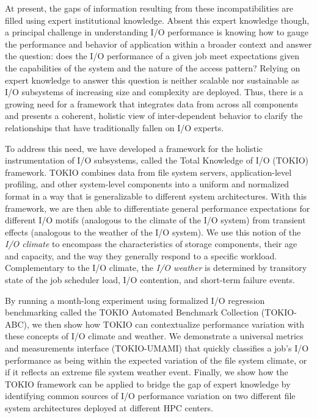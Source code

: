 At present, the gaps of information resulting from these incompatibilities are filled using expert institutional knowledge.
Absent this expert knowledge though, a principal challenge in understanding I/O performance is knowing how to gauge the performance and behavior of application within a broader context and answer the question: 
does the I/O performance of a given job meet expectations given the capabilities of the system and the nature of the access pattern?
Relying on expert knowledge to answer this question is neither scalable nor sustainable as I/O subsystems of increasing size and complexity are deployed.
Thus, there is a growing need for a framework that integrates data from across all components and presents a coherent, holistic view of inter-dependent behavior to clarify the relationships that have traditionally fallen on I/O experts.

To address this need, we have developed a framework for the holistic instrumentation of I/O subsystems, called the Total Knowledge of I/O (TOKIO) framework.
TOKIO combines data from file system servers, application-level profiling, and other system-level components into a uniform and normalized format in a way that is generalizable to different system architectures.
With this framework, we are then able to differentiate general performance expectations for different I/O motifs (analogous to the climate of the I/O system) from transient effects (analogous to the weather of the I/O system).
We use this notion of the \emph{I/O climate} to encompass the characteristics of storage components, their age and capacity, and the way they generally respond to a specific workload.
Complementary to the I/O climate, the \emph{I/O weather} is determined by transitory state of the job scheduler load, I/O contention, and short-term failure events.

By running a month-long experiment using formalized I/O regression benchmarking called the TOKIO Automated Benchmark Collection (TOKIO-ABC), we then show how TOKIO can contextualize performance variation with these concepts of I/O climate and weather.
We demonstrate a universal metrics and measurements interface (TOKIO-UMAMI) that quickly classifies a job's I/O performance as being within the expected variation of the file system climate, or if it reflects an extreme file system weather event. 
Finally, we show how the TOKIO framework can be applied to bridge the gap of expert knowledge by identifying common sources of I/O performance variation on two different file system architectures deployed at different HPC centers.

